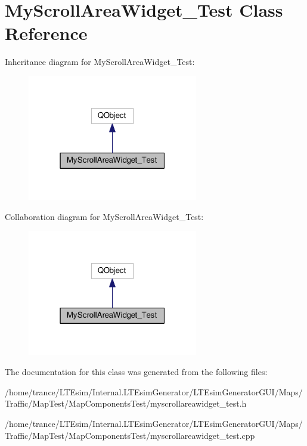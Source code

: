 \hypertarget{class_my_scroll_area_widget___test}{}\section{My\+Scroll\+Area\+Widget\+\_\+\+Test Class Reference}
\label{class_my_scroll_area_widget___test}


Inheritance diagram for My\+Scroll\+Area\+Widget\+\_\+\+Test\+:
\nopagebreak
\begin{figure}[H]
\begin{center}
\leavevmode
\includegraphics[width=211pt]{class_my_scroll_area_widget___test__inherit__graph}
\end{center}
\end{figure}


Collaboration diagram for My\+Scroll\+Area\+Widget\+\_\+\+Test\+:
\nopagebreak
\begin{figure}[H]
\begin{center}
\leavevmode
\includegraphics[width=211pt]{class_my_scroll_area_widget___test__coll__graph}
\end{center}
\end{figure}


The documentation for this class was generated from the following files\+:\begin{DoxyCompactItemize}
\item 
/home/trance/\+L\+T\+Esim/\+Internal.\+L\+T\+Esim\+Generator/\+L\+T\+Esim\+Generator\+G\+U\+I/\+Maps/\+Traffic/\+Map\+Test/\+Map\+Components\+Test/myscrollareawidget\+\_\+test.\+h\item 
/home/trance/\+L\+T\+Esim/\+Internal.\+L\+T\+Esim\+Generator/\+L\+T\+Esim\+Generator\+G\+U\+I/\+Maps/\+Traffic/\+Map\+Test/\+Map\+Components\+Test/myscrollareawidget\+\_\+test.\+cpp\end{DoxyCompactItemize}
